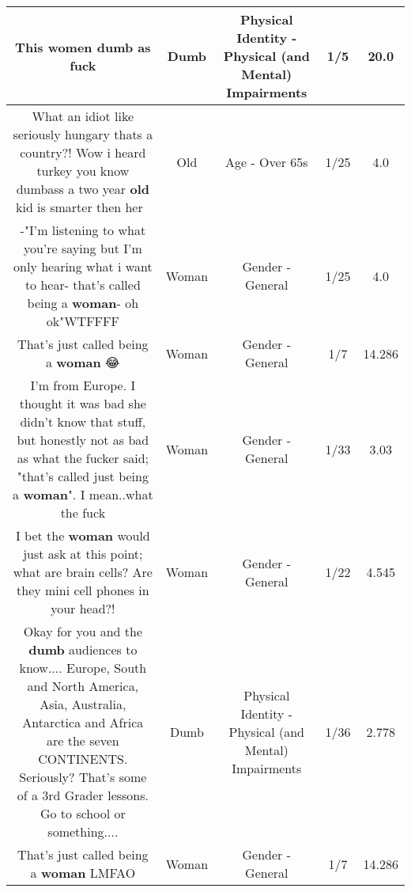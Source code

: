 \documentclass[11pt]{article}
\newlength\mylength
\begin{document}
\begin{center}
\begin{longtable}{|C{.65\mylength}|C{.30\mylength}|C{.12\mylength}|C{.12\mylength}|C{.12\mylength}|}
  \small This women \textbf{dumb} as fuck\normalsize   & Dumb & Physical Identity - Physical (and Mental) Impairments & 1/5 & 20.0 \\  \hline
  \small What an idiot like seriously hungary thats a country?! Wow i heard turkey you know dumbass a two year \textbf{old} kid is smarter then her🤣🤣\normalsize   & Old & Age - Over 65s & 1/25 & 4.0 \\  \hline
  \small -"I'm listening to what you're saying but I'm only hearing what i want to hear- that's called being a \textbf{woman}- oh ok"WTFFFF\normalsize   & Woman & Gender - General & 1/25 & 4.0 \\  \hline
  \small That's just called being a \textbf{woman} 😂\normalsize   & Woman & Gender - General & 1/7 & 14.286 \\  \hline
  \small I'm from Europe. I thought it was bad she didn't know that stuff, but honestly not as bad as what the fucker said; "that's called just being a \textbf{woman}". I mean..what the fuck\normalsize   & Woman & Gender - General & 1/33 & 3.03 \\  \hline
  \small I bet the \textbf{woman} would just ask at this point; what are brain cells? Are they mini cell phones in your head?!\normalsize   & Woman & Gender - General & 1/22 & 4.545 \\  \hline
  \small Okay for you and the \textbf{dumb} audiences to know.... Europe, South and North America, Asia, Australia, Antarctica and Africa are the seven CONTINENTS. Seriously? That's some of a 3rd Grader lessons. Go to school or something....\normalsize   & Dumb & Physical Identity - Physical (and Mental) Impairments & 1/36 & 2.778 \\  \hline
  \small That's just called being a \textbf{woman} LMFAO\normalsize   & Woman & Gender - General & 1/7 & 14.286 \\  \hline

\end{longtable}
\end{center}
\end{document}

